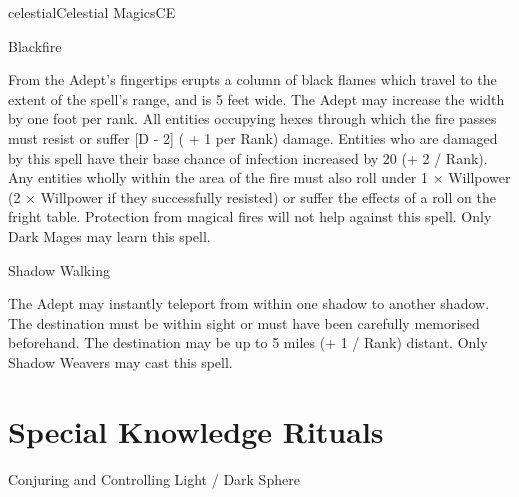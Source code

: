 \begin{College}[1.3]{celestial}{Celestial Magics}{CE}
\begin{spell}[S-10 Dark]{Blackfire}
\begin{effects}
From the Adept’s fingertips erupts a column of black flames which
travel to the extent of the spell’s range, and is 5 feet wide.  The
Adept may increase the width by one foot per rank.  All entities
occupying hexes through which the fire passes must resist or suffer [D
  - 2] ( + 1 per Rank) damage.  Entities who are damaged by this spell
have their base chance of infection increased by 20 (+ 2 / Rank). Any
entities wholly within the area of the fire must also roll under 1 ×
Willpower (2 × Willpower if they successfully resisted) or suffer the
effects of a roll on the fright table.  Protection from magical fires
will not help against this spell.  Only Dark Mages may learn this
spell.
\end{effects}
\end{spell}

\begin{spell}[S-10 Shadow]{Shadow Walking}

\begin{effects}
The Adept may instantly teleport from within one shadow to another
shadow. The destination must be within sight or must have been
carefully memorised beforehand.  The destination may be up to 5 miles
(+ 1 / Rank) distant. Only Shadow Weavers may cast this spell.
\end{effects}
\end{spell}

\section{Special Knowledge Rituals}

\begin{ritual}[R-1]{Conjuring and Controlling Light / Dark Sphere}


\end{ritual}
\end{College}
